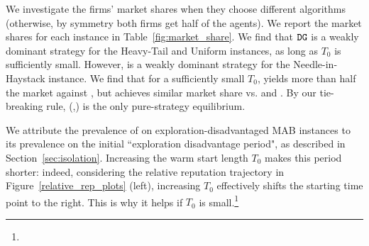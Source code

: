\documentclass[../competing_bandits_with_appendix.tex]{subfiles}
\begin{document}

We investigate the firms' market shares when they choose different algorithms (otherwise, by symmetry both firms get half of the agents). We report the market shares for each instance in Table~\ref{fig:market_share}. We find that $\mathtt{DG}$ is a weakly dominant strategy for the Heavy-Tail and Uniform instances, as long as $T_0$ is sufficiently small. However, \Thompson is a weakly dominant strategy for the Needle-in-Haystack instance. We find that for a sufficiently small $T_0$, \DynamicGreedy yields more than half the market against \Thompson,  but achieves similar market share vs. \DynamicGreedy and \DynamicEpsGreedy. By our tie-breaking rule, (\DynamicGreedy,\DynamicGreedy) is the only pure-strategy equilibrium.



We attribute the prevalence of \DynamicGreedy on exploration-disadvantaged MAB instances to its prevalence on the initial ``exploration disadvantage period", as described in Section~\ref{sec:isolation}. Increasing the warm start length $T_0$ makes this period shorter: indeed, considering the relative reputation trajectory in Figure~\ref{relative_rep_plots} (left), increasing $T_0$ effectively shifts the starting time point to the right. This is why it helps \DynamicGreedy if $T_0$ is small.\footnote{}
\end{document}
